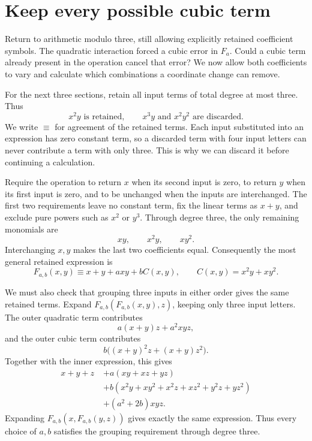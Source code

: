 \section{Keep every possible cubic term}\label{sec:cubic-laws}

Return to arithmetic modulo three, still allowing explicitly retained coefficient symbols. The quadratic interaction forced a cubic error in \(F_a\). Could a cubic term already present in the operation cancel that error? We now allow both coefficients to vary and calculate which combinations a coordinate change can remove.

For the next three sections, retain all input terms of total degree at most three. Thus
\[
 x^2y\text{ is retained},\qquad
 x^3y\text{ and }x^2y^2\text{ are discarded}.
\]
We write \(\equiv\) for agreement of the retained terms. Each input substituted into an expression has zero constant term, so a discarded term with four input letters can never contribute a term with only three. This is why we can discard it before continuing a calculation.

Require the operation to return \(x\) when its second input is zero, to return \(y\) when its first input is zero, and to be unchanged when the inputs are interchanged. The first two requirements leave no constant term, fix the linear terms as \(x+y\), and exclude pure powers such as \(x^2\) or \(y^3\). Through degree three, the only remaining monomials are
\[
 xy,\qquad x^2y,\qquad xy^2.
\]
Interchanging \(x,y\) makes the last two coefficients equal. Consequently the most general retained expression is
\begin{equation}\label{eq:general-jet}
 F_{a,b}(x,y)\equiv x+y+a xy+bC(x,y),
 \qquad C(x,y)=x^2y+xy^2.
\end{equation}

We must also check that grouping three inputs in either order gives the same retained terms. Expand \(F_{a,b}(F_{a,b}(x,y),z)\), keeping only three input letters. The outer quadratic term contributes
\[
 a(x+y)z+a^2xyz,
\]
and the outer cubic term contributes
\[
 b\bigl((x+y)^2z+(x+y)z^2\bigr).
\]
Together with the inner expression, this gives
\begin{equation}\label{eq:common-cubic-expansion}
 \begin{split}
 x+y+z\;&+a(xy+xz+yz)\\
 &+b(x^2y+xy^2+x^2z+xz^2+y^2z+yz^2)\\
 &+(a^2+2b)xyz.
 \end{split}
\end{equation}
Expanding \(F_{a,b}(x,F_{a,b}(y,z))\) gives exactly the same expression. Thus every choice of \(a,b\) satisfies the grouping requirement through degree three.


